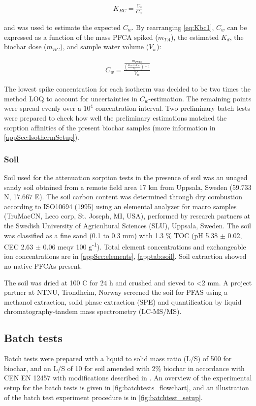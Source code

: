 \begin{align}
    \label{eq:Kbc1}
    K_{BC} = \frac{C_s}{C_w}
\end{align}

and was used to estimate the expected $C_w$. By rearranging \cref{eq:Kbc1}, $C_w$ can be expressed as a function of the mass PFCA spiked ($m_{TA}$), the estimated $K_d$, the biochar dose ($m_{BC}$), and sample water volume ($V_w$):

\begin{align}
    \label{eq:Cw2}
    C_w=\frac{\frac{m_{PFAS}}{\left (\frac{m_{BC}\times K_{BC}}{V_w}\right)+1}}{V_w}
\end{align}

The lowest spike concentration for each isotherm was decided to be two times the method LOQ to account for uncertainties in $C_w$-estimation. The remaining points were spread evenly over a $10^4$ concentration interval. Two preliminary batch tests were prepared to check how well the preliminary estimations matched the sorption affinities of the present biochar samples (more information in \cref{appSec:IsothermSetup}).

\subsubsection{Soil}
Soil used for the attenuation sorption tests in the presence of soil was an unaged sandy soil obtained from a remote field area 17 km from Uppsala, Sweden (59.733 N, 17.667 E). The soil carbon content was determined through dry combustion according to ISO10694 (1995) using an elemental analyzer for macro samples (TruMac\textregistered CN, Leco corp, St. Joseph, MI, USA), performed by research partners at the Swedish University of Agricultural Sciences (SLU), Uppsala, Sweden. The soil was classified as a fine sand (0.1 to 0.3 mm) with 1.3 \% TOC (pH 5.38 $\pm$ 0.02, CEC 2.63 $\pm$ 0.06 meqv 100 g\textsuperscript{-1}). Total element concentrations and exchangeable ion concentrations are in \cref{appSec:elements}, \cref{apptab:soil}. Soil extraction showed no native PFCAs present.

The soil was dried at 100 \textdegree C for 24 h and crushed and sieved to \textless 2 mm.  A project partner at NTNU, Trondheim, Norway screened the soil for PFAS using a methanol extraction, solid phase extraction (SPE) and quantification by liquid chromatography-tandem mass spectrometry (LC-MS/MS). 

\subsection{Batch tests\label{sec:S-BC}}
Batch tests were prepared with a liquid to solid mass ratio (L/S) of 500 for biochar, and an L/S of 10 for soil amended with 2\% biochar in accordance with CEN EN 12457 with modifications described in \citep{Hale2017fire, kupryianchyk2016biochar}. An overview of the experimental setup for the batch tests is given in \cref{fig:batchtests_flowchart}, and an illustration of the batch test experiment procedure is in \cref{fig:batchtest_setup}.

